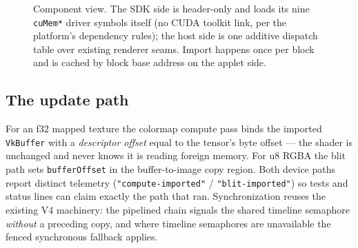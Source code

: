 \documentclass[11pt]{article}
\begin{document}
\begin{figure}[ht]
\caption{Component view. The SDK side is header-only and loads its nine
\texttt{cuMem*} driver symbols itself (no CUDA toolkit link, per the
platform's dependency rules); the host side is one additive dispatch table
over existing renderer seams. Import happens once per block and is cached by
block base address on the applet side.}
\label{fig:arch}
\end{figure}

\subsection{The update path}
For an f32 mapped texture the colormap compute pass binds the imported
\texttt{VkBuffer} with a \emph{descriptor offset} equal to the tensor's byte
offset --- the shader is unchanged and never knows it is reading foreign
memory. For u8 RGBA the blit path sets \texttt{bufferOffset} in the
buffer-to-image copy region. Both device paths report distinct telemetry
(\texttt{"compute-imported"} / \texttt{"blit-imported"}) so tests and status
lines can claim exactly the path that ran. Synchronization reuses the
existing V4 machinery: the pipelined chain signals the shared timeline
semaphore \emph{without} a preceding copy, and where timeline semaphores are
unavailable the fenced synchronous fallback applies.
\end{document}
